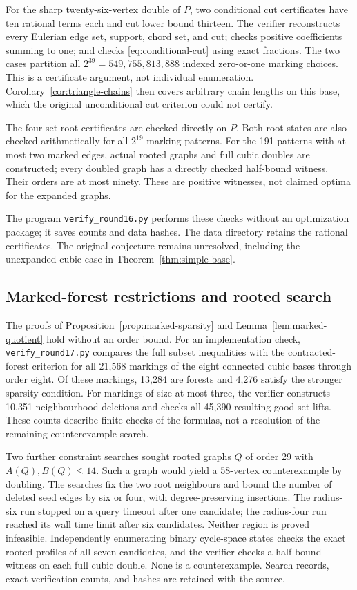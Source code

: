 \documentclass[11pt]{article}
\begin{document}
For the sharp twenty-six-vertex double of $P$, two conditional
cut certificates have ten rational terms each and cut lower bound
thirteen. The verifier reconstructs every Eulerian edge set,
support, chord set, and cut; checks positive coefficients summing
to one; and checks \eqref{eq:conditional-cut} using exact fractions.
The two cases partition all $2^{39}=549{,}755{,}813{,}888$ indexed
zero-or-one marking choices. This is a certificate argument, not
individual enumeration. Corollary~\ref{cor:triangle-chains} then
covers arbitrary chain lengths on this base, which the original
unconditional cut criterion could not certify.

The four-set root certificates are checked directly on $P$.
Both root states are also checked arithmetically for all $2^{19}$
marking patterns. For the 191 patterns with at most two marked
edges, actual rooted graphs and full cubic doubles are constructed;
every doubled graph has a directly checked half-bound witness.
Their orders are at most ninety. These are positive witnesses,
not claimed optima for the expanded graphs.

The program \texttt{verify\_round16.py} performs these checks
without an optimization package; it saves counts and data hashes.
The data directory retains the rational certificates. The original
conjecture remains unresolved, including the unexpanded cubic case
in Theorem~\ref{thm:simple-base}.

\subsection{Marked-forest restrictions and rooted search}\label{sec:round17}
The proofs of Proposition~\ref{prop:marked-sparsity} and
Lemma~\ref{lem:marked-quotient} hold without an order bound.
For an implementation check, \texttt{verify\_round17.py}
compares the full subset inequalities with the contracted-forest
criterion for all 21,568 markings of the eight connected cubic
bases through order eight. Of these markings, 13,284 are forests
and 4,276 satisfy the stronger sparsity condition. For markings
of size at most three, the verifier constructs 10,351 neighbourhood
deletions and checks all 45,390 resulting good-set lifts. These
counts describe finite checks of the formulas, not a resolution
of the remaining counterexample search.

Two further constraint searches sought rooted graphs $Q$ of order
29 with $A(Q),B(Q)\leq14$. Such a graph would yield a 58-vertex
counterexample by doubling. The searches fix the two root neighbours
and bound the number of deleted seed edges by six or four, with
degree-preserving insertions. The radius-six run stopped on a query
timeout after one candidate; the radius-four run reached its wall
time limit after six candidates. Neither region is proved
infeasible. Independently enumerating binary cycle-space states
checks the exact rooted profiles of all seven candidates, and
the verifier checks a half-bound witness on each full cubic double.
None is a counterexample. Search records, exact verification counts,
and hashes are retained with the source.
\end{document}
